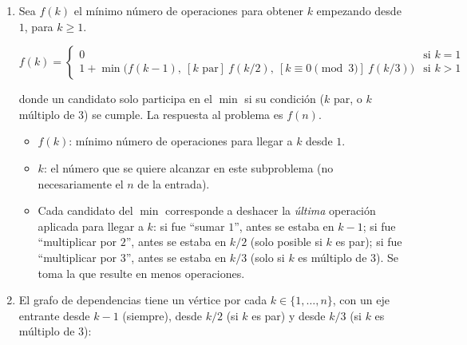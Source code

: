 \begin{enumerate}
  \item Sea $f(k)$ el mínimo número de operaciones para obtener $k$ empezando desde $1$, para $k \ge 1$.

  \[
  f(k) =
  \begin{cases}
  0 & \text{si } k = 1 \\
  1 + \min\big(f(k-1),\ [k \text{ par}]\ f(k/2),\ [k \equiv 0 \!\!\pmod 3]\ f(k/3)\big) & \text{si } k > 1
  \end{cases}
  \]

  donde un candidato solo participa en el $\min$ si su condición ($k$ par, o $k$ múltiplo de $3$) se cumple. La respuesta al problema es $f(n)$.

  \begin{itemize}
    \item $f(k)$: mínimo número de operaciones para llegar a $k$ desde $1$.
    \item $k$: el número que se quiere alcanzar en este subproblema (no necesariamente el $n$ de la entrada).
    \item Cada candidato del $\min$ corresponde a deshacer la \emph{última} operación aplicada para llegar a $k$: si fue ``sumar $1$'', antes se estaba en $k-1$; si fue ``multiplicar por $2$'', antes se estaba en $k/2$ (solo posible si $k$ es par); si fue ``multiplicar por $3$'', antes se estaba en $k/3$ (solo si $k$ es múltiplo de $3$). Se toma la que resulte en menos operaciones.
  \end{itemize}

  \pagebreak

  \item El grafo de dependencias tiene un vértice por cada $k \in \{1,\ldots,n\}$, con un eje entrante desde $k-1$ (siempre), desde $k/2$ (si $k$ es par) y desde $k/3$ (si $k$ es múltiplo de $3$):

\begin{center}


\end{center}
\end{enumerate}
